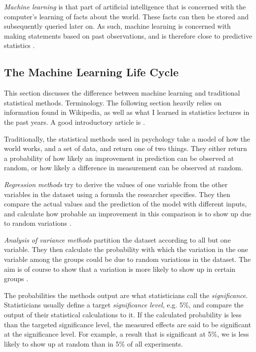 \documentclass[a4paper,man,12pt,apacite,floatsintext,draftfirst]{apa6} %
\begin{document}
\emph{Machine learning} is that part of artificial intelligence that
is concerned with the computer's learning of facts about the world.
These facts can then be stored and subsequently queried later on.
As such, machine learning is concerned with making statements based
on past observations, and is therefore close to predictive statistics
\cite{wpML}.

\subsection{The Machine Learning Life Cycle}
This section discusses the difference between machine learning and traditional
statistical methods. Terminology.
The following section heavily relies on information found in Wikipedia, as
well as what I learned in statistics lectures in the past years.
A good introductory article is \cite{wpML}.

Traditionally, the statistical methods used in psychology
take a model of how the world works, and a set of data, and return one of
two things.
They either return a probability of how likely an improvement in prediction
can be observed at random, or how likely a difference in measurement can be
observed at random.

\emph{Regression methods} try to derive the values of
one variable from the other variables in the dataset using a formula the
researcher specifies.
They then compare the actual values and the prediction of the model with
different inputs, and calculate how probable an improvement in this
comparison is to show up due to random variations \cite{wpRA}.

\emph{Analysis of variance methods} partition the dataset
according to all but one variable. They then calculate the probability with
which the variation in the one variable among the groups could be due to
random variations in the dataset.
The aim is of course to show that a variation is more likely to show up in
certain groups \cite{wpAOV}.

The probabilities the methods output are what statisticians call the
\emph{significance}.
Statisticians usually define a target \emph{significance level},
e.g. 5\%, and compare the output of their statistical calculations to it.
If the calculated probability is less than the targeted significance level,
the measured effects are said to be significant at the significance level.
For example, a result that is significant at 5\%, we is less
likely to show up at random than in 5\% of all experiments.
\end{document}
